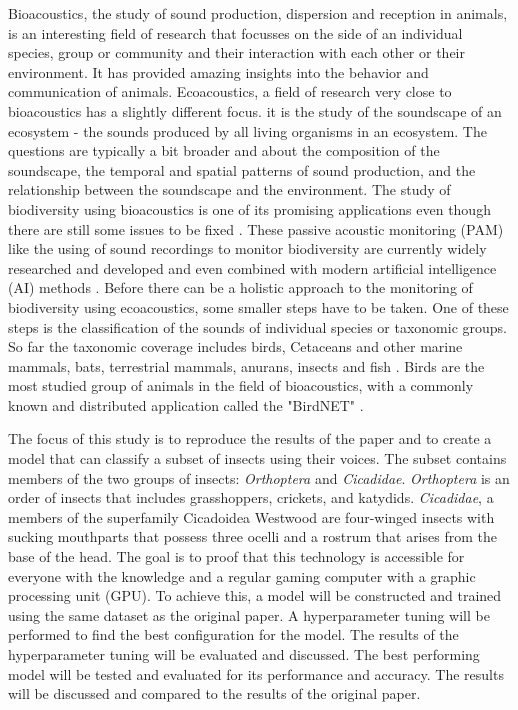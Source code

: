 Bioacoustics, the study of sound production, dispersion and reception in animals, is an interesting
field of research that focusses on the side of an individual species, group or community
and their interaction with each other or their environment. 
It has provided amazing insights into the behavior and communication of animals.
Ecoacoustics, a field of research very close to bioacoustics has a slightly different focus.
it is the study of the soundscape of an ecosystem - the sounds produced by all living organisms in an ecosystem.
The questions are typically a bit broader and about the composition of the soundscape, the temporal and spatial patterns of sound production, 
and the relationship between the soundscape and the environment. The study of biodiversity using bioacoustics
is one of its promising applications even though there are still some issues to be fixed \autocite{scarpelliMultiIndexEcoacousticsAnalysis2021}. 
These passive acoustic monitoring (PAM) like the using of sound recordings to monitor biodiversity are currently widely researched
and developed and even combined with modern artificial intelligence (AI) methods \autocite{dengHarnessingPowerSound2023}.
Before there can be a holistic approach to the monitoring of biodiversity using ecoacoustics, some smaller steps have to be taken.
One of these steps is the classification of the sounds of individual species or taxonomic groups.
So far the taxonomic coverage includes birds, Cetaceans and other marine mammals, bats, terrestrial mammals,
anurans, insects and fish \autocite[4]{stowellComputationalBioacousticsDeep2022}.
Birds are the most studied group of animals in the field of bioacoustics, with a
commonly known and distributed application called the "BirdNET" \autocite{kahlBirdNETDeepLearning2021}.

The focus of this study is to reproduce the results of the paper \autocite{faissInsectSet32DatasetAutomatic2022} and to create a model 
that can classify a subset of insects using their voices. The subset contains members of the two groups of insects: \textit{Orthoptera} and \textit{Cicadidae}.
\textit{Orthoptera} is an order of insects that includes grasshoppers, crickets, and katydids. \autocite{capineraOrthoptera2008}
\textit{Cicadidae}, a members of the superfamily Cicadoidea Westwood are four-winged insects with sucking 
mouthparts that possess three ocelli and a rostrum that arises from the base of the head. \autocite{sanbornCicadasHemipteraCicadoidea2008}
The goal is to proof that this technology is accessible for everyone with the knowledge and a 
regular gaming computer with a graphic processing unit (GPU). To achieve this, a model will be
constructed and trained using the same dataset as the original paper. A hyperparameter tuning will be performed to find the best
configuration for the model. The results of the hyperparameter tuning will be evaluated and discussed.
The best performing model will be tested and evaluated for its performance and accuracy. The results will be
discussed and compared to the results of the original paper.
